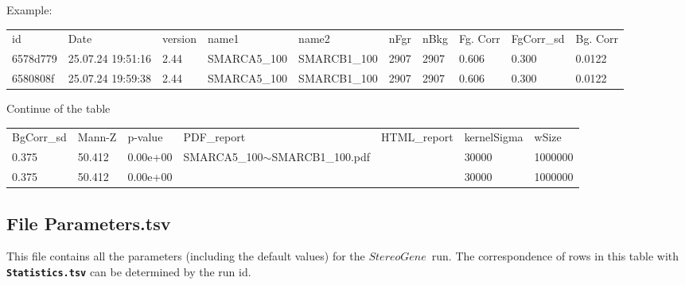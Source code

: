\documentclass{article}
\newcommand{\tw}{\textwidth}
\newcommand{\prm}[1]{\texttt{\textbf{{#1}}}}
\newcommand{\sg}{$StereoGene$\ }
\begin{document}
Example:

\begin{minipage}{0.95\tw}
\begin{shaded}
\begin{scriptsize}
\begin{tabular}{llllllllll}
id       & Date              & version & name1       & name2       & nFgr & nBkg & Fg. Corr & FgCorr\_sd & Bg. Corr\\
6578d779 & 25.07.24 19:51:16 & 2.44    & SMARCA5\_100 & SMARCB1\_100 & 2907 & 2907 & 0.606    & 0.300    & 0.0122  \\
6580808f & 25.07.24 19:59:38 & 2.44    & SMARCA5\_100 & SMARCB1\_100 & 2907 & 2907 & 0.606    & 0.300    & 0.0122  \\
\end{tabular}
\end{scriptsize}
\end{shaded}
\end{minipage} 

Continue of the table


\begin{flushright}
\begin{minipage}{0.85\tw}
\begin{shaded} 
\begin{scriptsize}
\begin{tabular}{lllllll}
 BgCorr\_sd & Mann-Z & p-value  & PDF\_report                   & HTML\_report & kernelSigma & wSize  \\
 0.375      & 50.412 & 0.00e+00 & SMARCA5\_100$\sim$SMARCB1\_100.pdf &              & 30000       & 1000000\\
 0.375      & 50.412 & 0.00e+00 &                               &              & 30000       & 1000000\\
\end{tabular}
\end{scriptsize}
\end{shaded}
\end{minipage} 

\end{flushright}


\subsection{File Parameters.tsv}
This file contains all the parameters (including the default values) for the \sg run. 
The correspondence of rows in this table with \prm{Statistics.tsv} can be determined by the run id.
\end{document}
